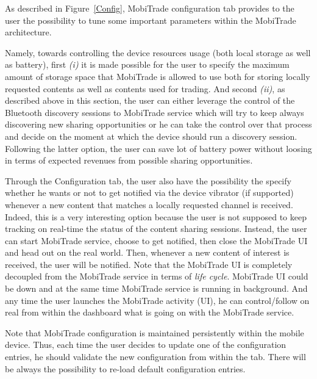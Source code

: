 As described in Figure~\ref{Config}, MobiTrade configuration tab provides to the user the possibility to tune some important parameters within the MobiTrade architecture. 

Namely, towards controlling the device resources usage (both local storage as well as battery), first  \emph{(i)} it is made possible for the user to specify the maximum amount of storage space that MobiTrade is allowed to use both for storing locally requested contents as well as contents used for trading. And second \emph{(ii)}, as described above in this section, the user can either leverage the control of the Bluetooth discovery sessions to MobiTrade service which will try to keep always discovering new sharing opportunities or he can take the control over that process and decide on the moment at which the device should run a discovery session. Following the latter option, the user can save lot of battery power without loosing in terms of expected revenues from possible sharing opportunities.

Through the Configuration tab, the user also have the possibility the specify whether he wants or not to get notified via the device vibrator (if supported) whenever a new content that matches a locally requested channel is received. Indeed, this is a very interesting option because the user is not supposed to keep tracking on real-time the status of the content sharing sessions. Instead, the user can start MobiTrade service, choose to get notified, then close the MobiTrade UI and head out on the real world. Then, whenever a new content of interest is received, the user will be notified. Note that the MobiTrade UI is completely decoupled from the MobiTrade service in terms of \emph{life cycle}. MobiTrade UI could be down and at the same time MobiTrade service is running in background. And any time the user launches the MobiTrade activity (UI), he can control/follow on real from within the dashboard what is going on with the MobiTrade service.

Note that MobiTrade configuration is maintained persistently within the mobile device. Thus, each time the user decides to update one of the configuration entries, he should validate the new configuration from within the tab. There will be always the possibility to re-load default configuration entries.

